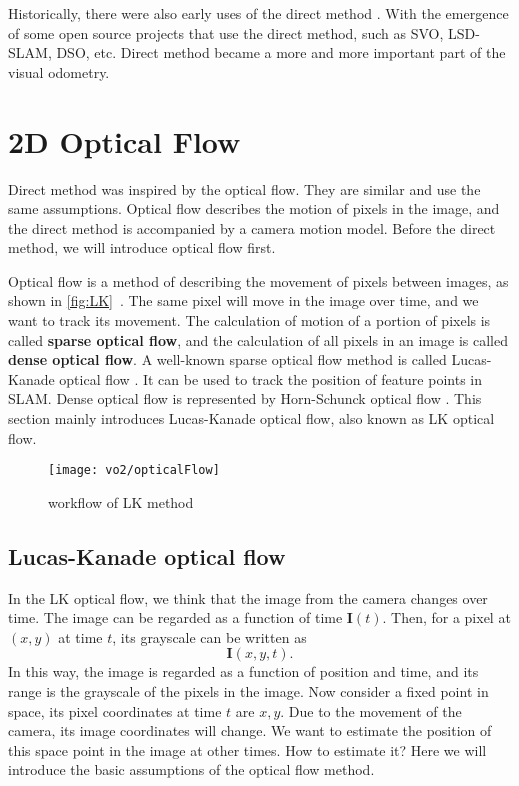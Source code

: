 Historically, there were also early uses of the direct method \textsuperscript{\cite{Silveira2008}}. With the emergence of some open source projects that use the direct method, such as SVO\textsuperscript{\cite{Forster2014}}, LSD-SLAM\textsuperscript{\cite{Engel2014}}, DSO\textsuperscript{\cite{Engel2016}}, etc. Direct method became a more and more important part of the visual odometry.

\section{2D Optical Flow}
Direct method was inspired by the optical flow. They are similar and use the same assumptions. Optical flow describes the motion of pixels in the image, and the direct method is accompanied by a camera motion model. Before the direct method, we will introduce optical flow first.

Optical flow is a method of describing the movement of pixels between images, as shown in \autoref{fig:LK}~. The same pixel will move in the image over time, and we want to track its movement. The calculation of motion of a portion of pixels is called \textbf{sparse optical flow}, and the calculation of all pixels in an image is called \textbf{dense optical flow}. A well-known sparse optical flow method is called Lucas-Kanade optical flow \textsuperscript{\cite{Lucas1981}}. It can be used to track the position of feature points in SLAM. Dense optical flow is represented by Horn-Schunck optical flow \textsuperscript{\cite{Horn1981}}. This section mainly introduces Lucas-Kanade optical flow, also known as LK optical flow.

\begin{figure}[!htp]
	\centering
	\texttt{[image: vo2/opticalFlow]}
	\caption{workflow of LK method}
	\label{fig:LK}
\end{figure}

\subsection*{Lucas-Kanade optical flow}
In the LK optical flow, we think that the image from the camera changes over time. The image can be regarded as a function of time $\bm{I}(t)$. Then, for a pixel at $(x,y)$ at time $t$, its grayscale can be written as
\[
\bm{I}(x,y,t).
\]
In this way, the image is regarded as a function of position and time, and its range is the grayscale of the pixels in the image. Now consider a fixed point in space, its pixel coordinates at time $t$ are $x,y$. Due to the movement of the camera, its image coordinates will change. We want to estimate the position of this space point in the image at other times. How to estimate it? Here we will introduce the basic assumptions of the optical flow method.

